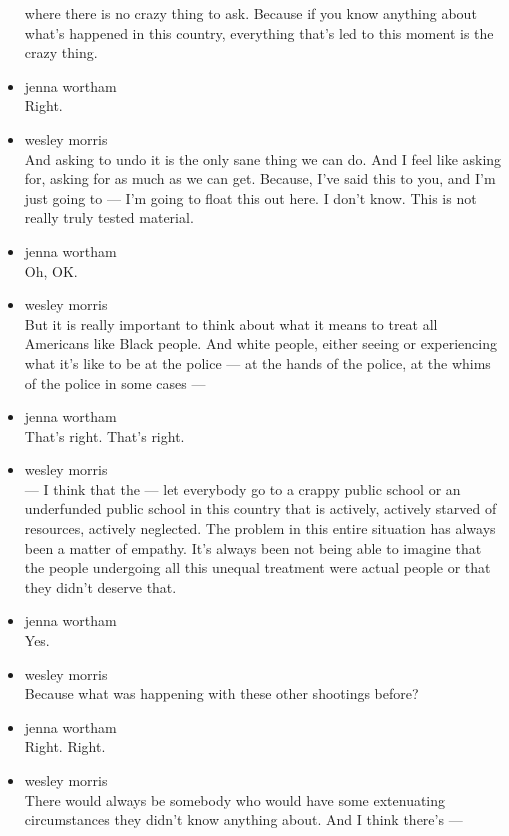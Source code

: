 \begin{itemize}
  where there is no crazy thing to ask. Because if you know anything
  about what's happened in this country, everything that's led to this
  moment is the crazy thing.
\item
  jenna wortham\\
  Right.
\item
  wesley morris\\
  And asking to undo it is the only sane thing we can do. And I feel
  like asking for, asking for as much as we can get. Because, I've said
  this to you, and I'm just going to --- I'm going to float this out
  here. I don't know. This is not really truly tested material.
\item
  jenna wortham\\
  Oh, OK.
\item
  wesley morris\\
  But it is really important to think about what it means to treat all
  Americans like Black people. And white people, either seeing or
  experiencing what it's like to be at the police --- at the hands of
  the police, at the whims of the police in some cases ---
\item
  jenna wortham\\
  That's right. That's right.
\item
  wesley morris\\
  --- I think that the --- let everybody go to a crappy public school or
  an underfunded public school in this country that is actively,
  actively starved of resources, actively neglected. The problem in this
  entire situation has always been a matter of empathy. It's always been
  not being able to imagine that the people undergoing all this unequal
  treatment were actual people or that they didn't deserve that.
\item
  jenna wortham\\
  Yes.
\item
  wesley morris\\
  Because what was happening with these other shootings before?
\item
  jenna wortham\\
  Right. Right.
\item
  wesley morris\\
  There would always be somebody who would have some extenuating
  circumstances they didn't know anything about. And I think there's ---


\end{itemize}
